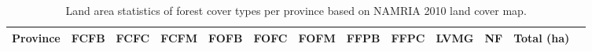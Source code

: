 \begin{appendices}
\begin{landscape}
\begin{spacing}{1.0}
\begin{longtable}[h!]{ @{}lrrrrrrrrrrrr@{} }

    \caption[Land area statistics of forest cover types per province based on NAMRIA 2010 land cover map.]{Land area statistics of forest cover types per province based on NAMRIA 2010 land cover map.}
    \label{tab: appendix-table.b1}\\
    
    	\toprule
    	Province & FCFB & FCFC & FCFM & FOFB & FOFC & FOFM & FFPB & FFPC & LVMG & NF & Total (ha)\\ 
    	\midrule
    	\endhead
    	

\end{longtable}
\end{spacing}
\end{landscape}
\end{appendices}
